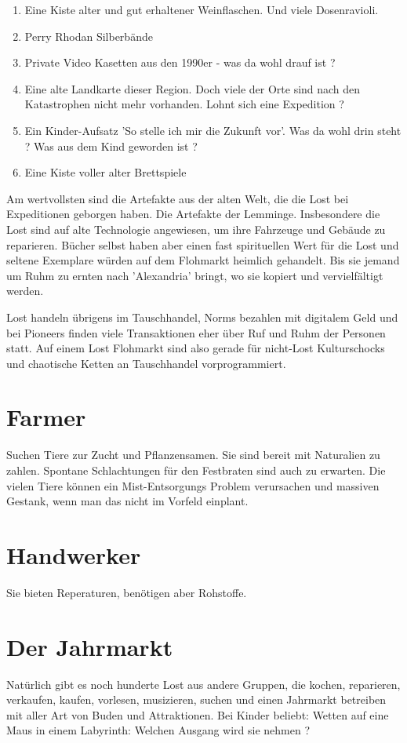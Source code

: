 \begin{enumerate}
    \item Eine Kiste alter und gut erhaltener Weinflaschen. Und viele Dosenravioli.
    \item Perry Rhodan Silberbände
    \item Private Video Kasetten aus den 1990er - was da wohl drauf ist ?
    \item Eine alte Landkarte dieser Region. Doch viele der Orte sind nach den Katastrophen nicht mehr vorhanden. Lohnt sich eine Expedition ?
    \item Ein Kinder-Aufsatz 'So stelle ich mir die Zukunft vor'. Was da wohl drin steht ? Was aus dem Kind geworden ist ?
    \item Eine Kiste voller alter Brettspiele
\end{enumerate}

Am wertvollsten sind die Artefakte aus der alten Welt, die die Lost bei Expeditionen geborgen haben. Die Artefakte der Lemminge. Insbesondere die Lost sind auf alte Technologie angewiesen, um ihre Fahrzeuge und Gebäude zu reparieren. Bücher selbst haben aber einen fast spirituellen Wert für die Lost und seltene Exemplare würden auf dem Flohmarkt heimlich gehandelt. Bis sie jemand um Ruhm zu ernten nach 'Alexandria' bringt, wo sie kopiert und vervielfältigt werden.

Lost handeln übrigens im Tauschhandel, Norms bezahlen mit digitalem Geld und bei Pioneers finden viele Transaktionen eher über Ruf und Ruhm der Personen statt. Auf einem Lost Flohmarkt sind also gerade für nicht-Lost Kulturschocks und chaotische Ketten an Tauschhandel vorprogrammiert.

\section{Farmer}

Suchen Tiere zur Zucht und Pflanzensamen. Sie sind bereit mit Naturalien zu zahlen. Spontane Schlachtungen für den Festbraten sind auch zu erwarten. Die vielen Tiere können ein Mist-Entsorgungs Problem verursachen und massiven Gestank, wenn man das nicht im Vorfeld einplant.

\section{Handwerker}

Sie bieten Reperaturen, benötigen aber Rohstoffe.

\section{Der Jahrmarkt}

Natürlich gibt es noch hunderte Lost aus andere Gruppen, die kochen, reparieren, verkaufen, kaufen, vorlesen, musizieren, suchen und einen Jahrmarkt betreiben mit aller Art von Buden und Attraktionen. Bei Kinder beliebt: Wetten auf eine Maus in einem Labyrinth: Welchen Ausgang wird sie nehmen ?


